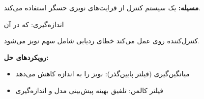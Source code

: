 

\textbf{مسیله:} یک سیستم کنترل از قرایت‌های نویزی حسگر استفاده می‌کند.

اندازه‌گیری:  که در آن 

کنترل‌کننده روی  عمل می‌کند \lr{\ensuremath{\to}} خطای ردیابی شامل سهم نویز می‌شود.

\textbf{رویکردهای حل:}

\begin{itemize}
\tightlist
\item
  میانگین‌گیری (فیلتر پایین‌گذر): نویز را به اندازه  کاهش می‌دهد
\item
  فیلتر کالمن: تلفیق بهینه پیش‌بینی مدل و اندازه‌گیری
\end{itemize}


